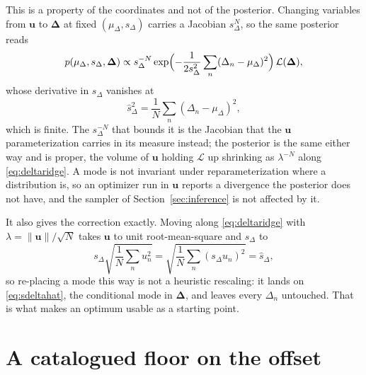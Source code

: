 \documentclass[11pt]{article}
\theoremstyle{plain}
\begin{document}
This is a property of the coordinates and not of the posterior. Changing variables from
$\mathbf{u}$ to $\boldsymbol{\Delta}$ at fixed $(\mu_{\Delta}, s_{\Delta})$ carries a
Jacobian $s_{\Delta}^{N}$, so the same posterior reads
\begin{equation}
  p(\mu_{\Delta}, s_{\Delta}, \boldsymbol{\Delta}) \propto
  s_{\Delta}^{-N}\exp\Bigl(-\frac{1}{2s_{\Delta}^{2}}
  \sum_{n}(\Delta_{n}-\mu_{\Delta})^{2}\Bigr)\,
  \mathcal{L}(\boldsymbol{\Delta}) ,
  \label{eq:deltacentred}
\end{equation}
whose derivative in $s_{\Delta}$ vanishes at
\begin{equation}
  \hat{s}_{\Delta}^{2} = \frac{1}{N}\sum_{n}(\Delta_{n}-\mu_{\Delta})^{2} ,
  \label{eq:sdeltahat}
\end{equation}
which is finite. The $s_{\Delta}^{-N}$ that bounds it is the Jacobian that the
$\mathbf{u}$ parameterization carries in its measure instead; the posterior is the same
either way and is proper, the volume of $\mathbf{u}$ holding $\mathcal{L}$ up shrinking as
$\lambda^{-N}$ along \eqref{eq:deltaridge}. A mode is not invariant under
reparameterization where a distribution is, so an optimizer run in $\mathbf{u}$ reports a
divergence the posterior does not have, and the sampler of
Section~\ref{sec:inference} is not affected by it.

It also gives the correction exactly. Moving along \eqref{eq:deltaridge} with
$\lambda = \lVert\mathbf{u}\rVert/\sqrt{N}$ takes $\mathbf{u}$ to unit root-mean-square and
$s_{\Delta}$ to
\begin{equation}
  s_{\Delta}\sqrt{\frac{1}{N}\sum_{n}u_{n}^{2}}
    = \sqrt{\frac{1}{N}\sum_{n}(s_{\Delta}u_{n})^{2}} = \hat{s}_{\Delta} ,
  \label{eq:replace}
\end{equation}
so re-placing a mode this way is not a heuristic rescaling: it lands on
\eqref{eq:sdeltahat}, the conditional mode in $\boldsymbol{\Delta}$, and leaves every
$\Delta_{n}$ untouched. That is what makes an optimum usable as a starting point.

\section{A catalogued floor on the offset}
\label{app:t0floor}
\end{document}
